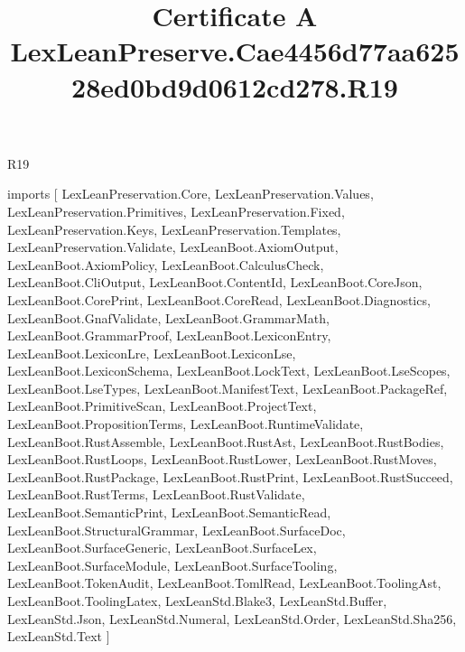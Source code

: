\begin{lexlean}{R19}
\title{Certificate A LexLeanPreserve.Cae4456d77aa62528ed0bd9d0612cd278.R19}
\begin{coremodule}
imports [
  LexLeanPreservation.Core,
  LexLeanPreservation.Values,
  LexLeanPreservation.Primitives,
  LexLeanPreservation.Fixed,
  LexLeanPreservation.Keys,
  LexLeanPreservation.Templates,
  LexLeanPreservation.Validate,
  LexLeanBoot.AxiomOutput,
  LexLeanBoot.AxiomPolicy,
  LexLeanBoot.CalculusCheck,
  LexLeanBoot.CliOutput,
  LexLeanBoot.ContentId,
  LexLeanBoot.CoreJson,
  LexLeanBoot.CorePrint,
  LexLeanBoot.CoreRead,
  LexLeanBoot.Diagnostics,
  LexLeanBoot.GnafValidate,
  LexLeanBoot.GrammarMath,
  LexLeanBoot.GrammarProof,
  LexLeanBoot.LexiconEntry,
  LexLeanBoot.LexiconLre,
  LexLeanBoot.LexiconLse,
  LexLeanBoot.LexiconSchema,
  LexLeanBoot.LockText,
  LexLeanBoot.LseScopes,
  LexLeanBoot.LseTypes,
  LexLeanBoot.ManifestText,
  LexLeanBoot.PackageRef,
  LexLeanBoot.PrimitiveScan,
  LexLeanBoot.ProjectText,
  LexLeanBoot.PropositionTerms,
  LexLeanBoot.RuntimeValidate,
  LexLeanBoot.RustAssemble,
  LexLeanBoot.RustAst,
  LexLeanBoot.RustBodies,
  LexLeanBoot.RustLoops,
  LexLeanBoot.RustLower,
  LexLeanBoot.RustMoves,
  LexLeanBoot.RustPackage,
  LexLeanBoot.RustPrint,
  LexLeanBoot.RustSucceed,
  LexLeanBoot.RustTerms,
  LexLeanBoot.RustValidate,
  LexLeanBoot.SemanticPrint,
  LexLeanBoot.SemanticRead,
  LexLeanBoot.StructuralGrammar,
  LexLeanBoot.SurfaceDoc,
  LexLeanBoot.SurfaceGeneric,
  LexLeanBoot.SurfaceLex,
  LexLeanBoot.SurfaceModule,
  LexLeanBoot.SurfaceTooling,
  LexLeanBoot.TokenAudit,
  LexLeanBoot.TomlRead,
  LexLeanBoot.ToolingAst,
  LexLeanBoot.ToolingLatex,
  LexLeanStd.Blake3,
  LexLeanStd.Buffer,
  LexLeanStd.Json,
  LexLeanStd.Numeral,
  LexLeanStd.Order,
  LexLeanStd.Sha256,
  LexLeanStd.Text
]


\end{coremodule}
\end{lexlean}
